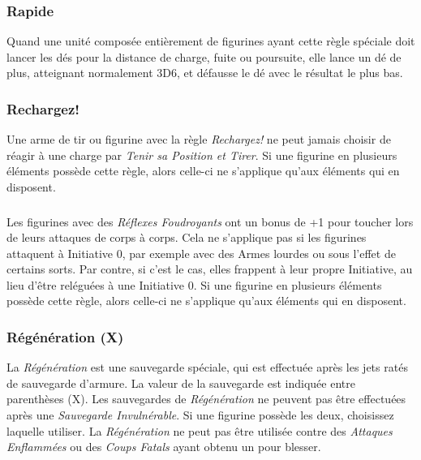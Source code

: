 \subsubsection*{Rapide}

Quand une unité composée entièrement de figurines ayant cette règle spéciale doit lancer les dés pour la distance de charge, fuite ou poursuite, elle lance un dé de plus, atteignant normalement 3D6, et défausse le dé avec le résultat le plus bas.

\subsubsection*{Rechargez!}

Une arme de tir ou figurine avec la règle \emph{Rechargez!} ne peut jamais choisir de réagir à une charge par \emph{Tenir sa Position et Tirer}. Si une figurine en plusieurs éléments possède cette règle, alors celle-ci ne s'applique qu'aux éléments qui en disposent.

\subsubsection*{}

Les figurines avec des \emph{Réflexes Foudroyants} ont un bonus de +1 pour toucher lors de leurs attaques de corps à corps. Cela ne s'applique pas si les figurines attaquent à Initiative 0, par exemple avec des Armes lourdes ou sous l'effet de certains sorts. Par contre, si c'est le cas, elles frappent à leur propre Initiative, au lieu d'être reléguées à une Initiative 0. Si une figurine en plusieurs éléments possède cette règle, alors celle-ci ne s'applique qu'aux éléments qui en disposent.

\subsubsection*{Régénération (X)}

La \emph{Régénération} est une sauvegarde spéciale, qui est effectuée après les jets ratés de sauvegarde d'armure. La valeur de la sauvegarde est indiquée entre parenthèses (X). Les sauvegardes de \emph{Régénération} ne peuvent pas être effectuées après une \emph{Sauvegarde Invulnérable}. Si une figurine possède les deux, choisissez laquelle utiliser. La \emph{Régénération} ne peut pas être utilisée contre des \emph{Attaques Enflammées} ou des \emph{Coups Fatals} ayant obtenu un  pour blesser.

